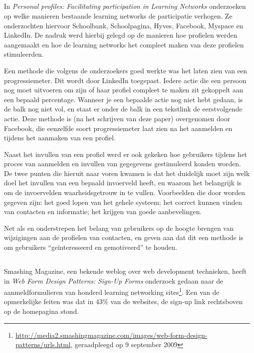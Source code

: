 \documentclass[a4paper, 10pt, pdftex]{report}
\begin{document}
    \subsection{\cite{Brouns2008}}

    In \emph{Personal profiles: Facilitating participation in Learning Networks} onderzoeken \citeauthor{Brouns2008} op welke manieren bestaande learning networks de participatie verhogen. Ze onderzochten hiervoor Schoolbank, Schoolpagina, Hyves, Facebook, Myspace en LinkedIn. De nadruk werd hierbij gelegd op de manieren hoe profielen werden aangemaakt en hoe de learning networks het compleet maken van deze profielen stimuleerden.

    Een methode die volgens de onderzoekers goed werkte was het laten zien van een progressiemeter. Dit wordt door LinkedIn toegepast. Iedere actie die een persoon nog moet uitvoeren om zijn of haar profiel compleet te maken zit gekoppelt aan een bepaald percentage. Wanneer je een bepaalde actie nog niet hebt gedaan, is de balk nog niet vol, en staat er onder de balk in een tekstlink de eerstvolgende actie. Deze methode is (na het schrijven van deze paper) overgenomen door Facebook, die eenzelfde soort progressiemeter laat zien na het aanmelden en tijdens het aanmaken van een profiel.

    Naast het invullen van een profiel werd er ook gekeken hoe gebruikers tijdens het proces van aanmelden en invullen van gegegevens gestimuleerd konden worden. De twee punten die hieruit naar voren kwamen is dat het duidelijk moet zijn welk doel het invullen van een bepaald invoerveld heeft, en waarom het belangrijk is om de invoervelden waarheidsgetrouw in te vullen. Voorbeelden die door \citeauthor{Brouns2008} worden gegeven zijn: het goed lopen van het gehele systeem; het correct kunnen vinden van contacten en informatie; het krijgen van goede aanbevelingen.

    Net als \citet{Berlanga2007} en \citet{Sohn2005} onderstrepen \citeauthor{Brouns2008} het belang van gebruikers op de hoogte brengen van wijzigingen aan de profielen van contacten, en geven aan dat dit een methode is om gebruikers ``ge\"interesseerd en gemotiveerd'' te houden.

    \subsection{\cite{Editorial2008}}

    Smashing Magazine, een bekende weblog over web development technieken, heeft in \emph{Web Form Design Patterns: Sign-Up Forms} onderzoek gedaan naar de aanmeldformulieren van honderd learning networking sites\footnote{\url{http://media2.smashingmagazine.com/images/web-form-design-patterns/urls.html}, geraadpleegd op 9 september 2009}. Een van de opmerkelijke feiten was dat in 43\% van de websites, de sign-up link rechtsboven op de homepagina stond.
\end{document}
